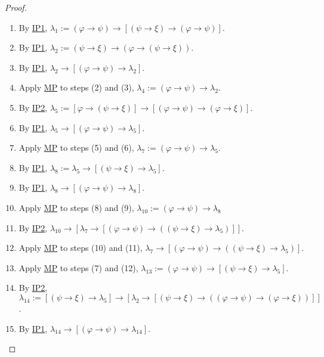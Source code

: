 \documentclass{treatise}
\begin{document}
\begin{proof}
\begin{enumerate}
    \item By \hyperref[HPL-A-IP1]{IP1}, $\lambda_1 := (\varphi \to \psi) \to [(\psi \to \xi) \to (\varphi \to \psi)]$.
    \\
    \item By \hyperref[HPL-A-IP1]{IP1}, $\lambda_2 := (\psi \to \xi) \to (\varphi \to (\psi \to \xi))$.
    \item By \hyperref[HPL-A-IP1]{IP1}, $\lambda_2 \to [(\varphi \to \psi) \to \lambda_2]$.
    \item Apply \hyperref[HPL-R-MP]{MP} to steps (2) and (3), $\lambda_4 := (\varphi \to \psi) \to \lambda_2$.
    \\
    \item By \hyperref[HPL-A-IP2]{IP2}, $\lambda_5 := [\varphi \to (\psi \to \xi)] \to [(\varphi \to \psi) \to (\varphi \to \xi)]$.
    \item By \hyperref[HPL-A-IP1]{IP1}, $\lambda_5 \to [(\varphi \to \psi) \to \lambda_5]$.
    \item Apply \hyperref[HPL-R-MP]{MP} to steps (5) and (6), $\lambda_7 := (\varphi \to \psi) \to \lambda_5$.
    \\
    \item By \hyperref[HPL-A-IP1]{IP1}, $\lambda_8 := \lambda_5 \to [(\psi \to \xi) \to \lambda_5]$.
    \item By \hyperref[HPL-A-IP1]{IP1}, $\lambda_8 \to [(\varphi \to \psi) \to \lambda_8]$.
    \item Apply \hyperref[HPL-R-MP]{MP} to steps (8) and (9), $\lambda_{10} := (\varphi \to \psi) \to \lambda_8$
    \\
    \item By \hyperref[HPL-A-IP2]{IP2}, $\lambda_{10} \to [\lambda_7 \to [(\varphi \to \psi) \to ((\psi \to \xi) \to \lambda_5)]]$.
    \item Apply \hyperref[HPL-R-MP]{MP} to steps (10) and (11), $\lambda_7 \to [(\varphi \to \psi) \to ((\psi \to \xi) \to \lambda_5)]$.
    \item Apply \hyperref[HPL-R-MP]{MP} to steps (7) and (12), $\lambda_{13} := (\varphi \to \psi) \to [(\psi \to \xi) \to \lambda_5]$.
    \\
    \item By \hyperref[HPL-A-IP2]{IP2}, $\lambda_{14} := [(\psi \to \xi) \to \lambda_5] \to [\lambda_2 \to [(\psi \to \xi) \to ((\varphi \to \psi) \to (\varphi \to \xi))]]$.
    \item By \hyperref[HPL-A-IP1]{IP1}, $\lambda_{14} \to [(\varphi \to \psi) \to \lambda_{14}]$.

\end{enumerate}
\end{proof}
\end{document}
